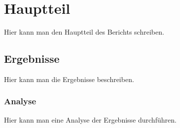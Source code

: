 \section{Hauptteil}
Hier kann man den Hauptteil des Berichts schreiben.

\subsection{Ergebnisse}
Hier kann man die Ergebnisse beschreiben.

\subsubsection{Analyse}
Hier kann man eine Analyse der Ergebnisse durchführen.